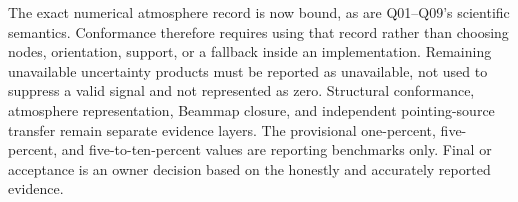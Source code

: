 \documentclass[10pt]{article}
\begin{document}
The exact numerical atmosphere record is now bound, as are Q01--Q09's
scientific semantics. Conformance therefore requires using that record rather
than choosing nodes, orientation, support, or a fallback inside an
implementation. Remaining unavailable uncertainty products must be reported
as unavailable, not used to suppress a valid signal and not represented as
zero. Structural conformance, atmosphere representation, Beammap closure, and
independent pointing-source transfer remain separate evidence layers. The
provisional one-percent, five-percent, and five-to-ten-percent values are
reporting benchmarks only. Final  or
 acceptance is an owner decision based on the
honestly and accurately reported evidence.
\end{document}
